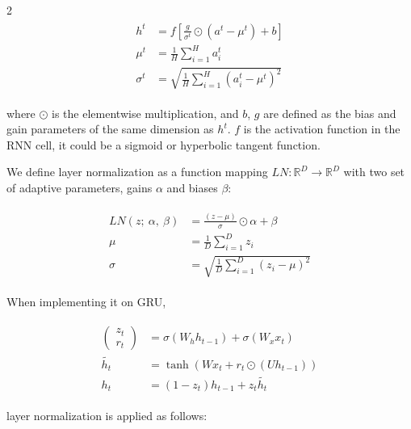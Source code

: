 \begin{multicols}{2}
\begin{align}
    \begin{split}
        h^{t} &= f \left[ \frac{g}{\sigma^t} \odot \left( a^t- \mu^t \right) +b \right] \\
        \mu^t &= \frac{1}{H} \sum^{H}_{i=1} a^{t}_{i} \\
        \sigma^t &= \sqrt{ \frac{1}{H} \sum^{H}_{i=1} \left( a^t_i - \mu^t \right)^2 }
    \end{split}
\end{align}


\noindent where $\odot$ is the elementwise multiplication, 
and $b$, $g$ are defined as the bias and gain parameters of the same dimension as $h^t$.
$f$ is the activation function in the RNN cell, it could be a sigmoid or hyperbolic tangent function.

We define layer normalization as a function mapping $LN: \mathbb{R}^D \rightarrow \mathbb{R}^D$ with two set of adaptive parameters,
gains $\alpha$ and biases $\beta$:

\begin{align}
    \begin{split}
        LN(z; \ \alpha, \ \beta) &= \frac{(z-\mu)}{\sigma} \odot \alpha + \beta \\
        \mu &= \frac{1}{D} \sum^{D}_{i=1} z_i \\
        \sigma &= \sqrt{ \frac{1}{D} \sum^{D}_{i=1} \left( z_i- \mu \right)^{2} }
    \end{split}
\end{align}

When implementing it on GRU,

\begin{align}
    \begin{split}
        \begin{pmatrix}
            z_t \\
            r_t
        \end{pmatrix} &=  \sigma( W_h h_{t-1} ) + \sigma( W_x x_t ) \\
        \tilde{ h_t } &= \tanh( W x_t +  r_t \odot \left( U h_{t-1} \right) ) \\
        h_t &= \left( 1- z_t \right) h_{t-1} + z_t \tilde{h_t}
    \end{split}
\end{align}

\noindent layer normalization is applied as follows:


\end{multicols}
